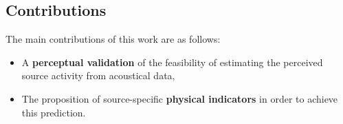 \documentclass[a0,portrait]{a0poster}
\begin{document}
\begin{multicols}{2}
\color{DarkSlateGray} %



\section*{Contributions}

The main contributions of this work are as follows:
\begin{itemize}
\item A \textbf{perceptual validation} of the feasibility of estimating the perceived source activity from acoustical data,
\item The proposition of source-specific \textbf{physical indicators} in order to achieve this prediction.
\end{itemize}


\end{multicols}
\end{document}

